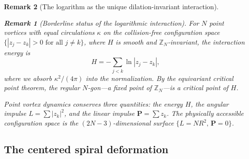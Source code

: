\documentclass[12pt, a4paper]{article}
\newtheorem{remark}{Remark}[section]
\numberwithin{equation}{section}
\begin{document}
\begin{remark}[The logarithm as the unique dilation-invariant interaction]
\begin{remark}[Borderline status of the logarithmic interaction]
For $N$ point vortices with equal circulations $\kappa$ on the
collision-free configuration space $\{|z_j - z_k| > 0 \text{ for all }
j \ne k\}$, where $H$ is smooth and $\mathbb{Z}_N$-invariant, the
interaction energy is
\begin{equation}\label{eq:thomson-H}
  H = -\sum_{j < k} \ln|z_j - z_k|,
\end{equation}
where we absorb $\kappa^2/(4\pi)$ into the normalization.
By the equivariant critical point theorem, the regular $N$-gon---a
fixed point of $\mathbb{Z}_N$---is a critical point of $H$.

Point vortex dynamics conserves three quantities: the energy $H$,
the angular impulse $L = \sum|z_k|^2$, and the linear impulse
$\mathbf{P} = \sum z_k$.  The physically accessible configuration
space is the $(2N-3)$-dimensional surface
$\{L = NR^2,\, \mathbf{P} = 0\}$.

\subsection{The centered spiral deformation}
\label{sec:results}


\end{remark}
\end{remark}
\end{document}
